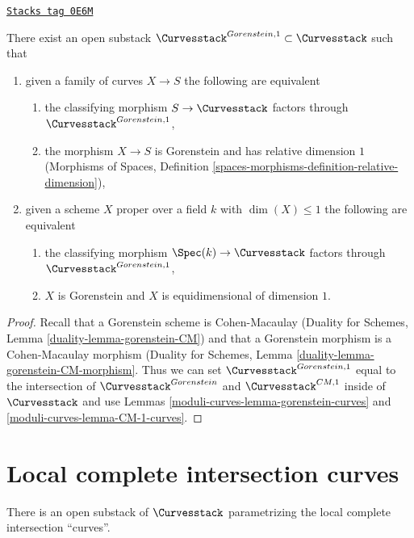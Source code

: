\begin{lemma}
\label{moduli-curves-lemma-gorenstein-1-curves}
\href{https://stacks.math.columbia.edu/tag/0E6M}{\texttt{Stacks tag 0E6M}}

There exist an open substack
$\Curvesstack^{Gorenstein, 1} \subset \Curvesstack$ such that
\begin{enumerate}
\item given a family of curves $X \to S$ the following are equivalent
\begin{enumerate}
\item the classifying morphism $S \to \Curvesstack$ factors
through $\Curvesstack^{Gorenstein, 1}$,
\item the morphism $X \to S$ is Gorenstein and has
relative dimension $1$ (Morphisms of Spaces, Definition
\ref{spaces-morphisms-definition-relative-dimension}),
\end{enumerate}
\item given a scheme $X$ proper over a field $k$ with $\dim(X) \leq 1$
the following are equivalent
\begin{enumerate}
\item the classifying morphism $\Spec(k) \to \Curvesstack$ factors
through $\Curvesstack^{Gorenstein, 1}$,
\item $X$ is Gorenstein and $X$ is equidimensional of
dimension $1$.
\end{enumerate}
\end{enumerate}
\end{lemma}

\begin{proof}
Recall that a Gorenstein scheme is Cohen-Macaulay
(Duality for Schemes, Lemma \ref{duality-lemma-gorenstein-CM})
and that
a Gorenstein morphism is a Cohen-Macaulay morphism
(Duality for Schemes, Lemma \ref{duality-lemma-gorenstein-CM-morphism}.
Thus we can set
$\Curvesstack^{Gorenstein, 1}$ equal to the intersection
of $\Curvesstack^{Gorenstein}$ and $\Curvesstack^{CM, 1}$
inside of $\Curvesstack$ and use
Lemmas \ref{moduli-curves-lemma-gorenstein-curves} and \ref{moduli-curves-lemma-CM-1-curves}.
\end{proof}

\section{Local complete intersection curves}
\label{moduli-curves-section-lci}
There is an open substack of $\Curvesstack$ parametrizing
the local complete intersection ``curves''.

